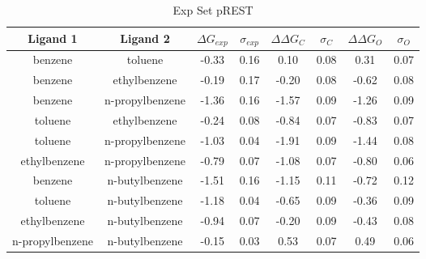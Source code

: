 \documentclass[T4paper.tex]{subfiles}
\begin{document}
\begin{table}[]
\centering
\caption{Exp Set pREST}
\label{tbl:exp_pREST_set}
\begin{tabular}{|c|c|c|c|c|c|c|c|}
\hline
\textbf{Ligand 1}                                & \textbf{Ligand 2}                                & \boldmath$\Delta G_{exp}$  & \boldmath$\sigma_{exp}$ & {\color[HTML]{800080} \boldmath$\Delta\Delta G_{C}$} & {\color[HTML]{800080} \boldmath$\sigma_{C}$} & {\color[HTML]{008000} \boldmath$\Delta\Delta G_{O}$} & {\color[HTML]{008000} \boldmath$\sigma_{O}$} \\ \hline
benzene         & toluene         & -0.33        & 0.16            & 0.10       & 0.08          & 0.31       & 0.07          \\ \hline
benzene         & ethylbenzene    &-0.19 & 0.17  & -0.20 & 0.08  & -0.62 & 0.08          \\ \hline
benzene         & n-propylbenzene & -1.36 & 0.16 & -1.57 & 0.09  & -1.26 & 0.09         \\ \hline
toluene         & ethylbenzene    & -0.24 & 0.08  & -0.84 & 0.07  & -0.83 & 0.07          \\ \hline
toluene         & n-propylbenzene & -1.03 & 0.04  & -1.91 & 0.09  & -1.44 & 0.08          \\ \hline
ethylbenzene    & n-propylbenzene & -0.79 & 0.07  & -1.08 & 0.07  & -0.80 & 0.06         \\ \hline
benzene         & n-butylbenzene  & -1.51 & 0.16 & -1.15 & 0.11  & -0.72 & 0.12         \\ \hline
toluene         & n-butylbenzene  & -1.18 & 0.04  & -0.65 & 0.09  & -0.36 & 0.09         \\ \hline
ethylbenzene    & n-butylbenzene  & -0.94 & 0.07  & -0.20 & 0.09  & -0.43 & 0.08         \\ \hline
n-propylbenzene & n-butylbenzene  & -0.15 & 0.03  & 0.53  & 0.07  & 0.49  & 0.06       \\ \hline
\end{tabular}
\end{table}
\end{document}
